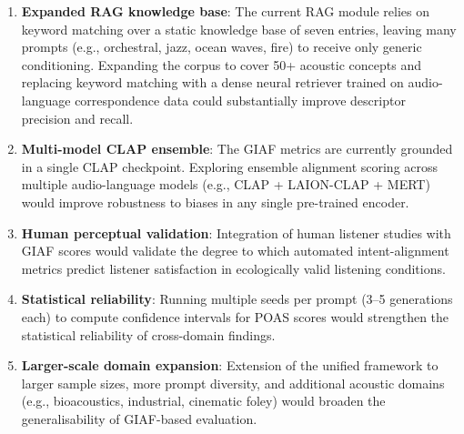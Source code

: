 \documentclass[journal]{IEEEtran}
\begin{document}
\begin{enumerate}[leftmargin=*]
\item \textbf{Expanded RAG knowledge base}: The current RAG module relies on
keyword matching over a static knowledge base of seven entries, leaving
many prompts (e.g., orchestral, jazz, ocean waves, fire) to receive only
generic conditioning. Expanding the corpus to cover 50+ acoustic concepts
and replacing keyword matching with a dense neural retriever trained on
audio-language correspondence data could substantially improve descriptor
precision and recall.

\item \textbf{Multi-model CLAP ensemble}: The GIAF metrics are currently
grounded in a single CLAP checkpoint. Exploring ensemble alignment scoring
across multiple audio-language models (e.g., CLAP + LAION-CLAP + MERT)
would improve robustness to biases in any single pre-trained encoder.

\item \textbf{Human perceptual validation}: Integration of human listener
studies with GIAF scores would validate the degree to which automated
intent-alignment metrics predict listener satisfaction in ecologically
valid listening conditions.

\item \textbf{Statistical reliability}: Running multiple seeds per prompt
(3--5 generations each) to compute confidence intervals for POAS scores
would strengthen the statistical reliability of cross-domain findings.

\item \textbf{Larger-scale domain expansion}: Extension of the unified
framework to larger sample sizes, more prompt diversity, and additional
acoustic domains (e.g., bioacoustics, industrial, cinematic foley)
would broaden the generalisability of GIAF-based evaluation.
\end{enumerate}
\end{document}
